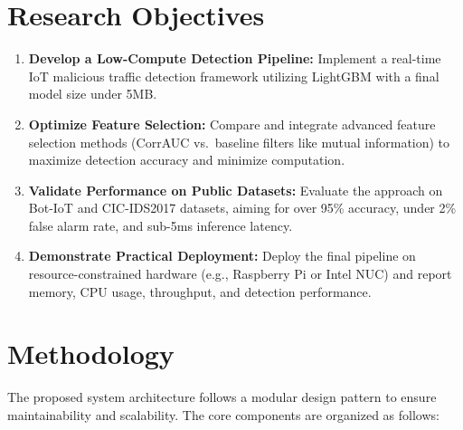\documentclass[12pt]{article}
\begin{document}

\section{Research Objectives}

\begin{enumerate}[(1)]
    \item \textbf{Develop a Low-Compute Detection Pipeline:} 
    Implement a real-time IoT malicious traffic detection framework utilizing LightGBM with a final model size under 5MB.
    
    \item \textbf{Optimize Feature Selection:} 
    Compare and integrate advanced feature selection methods (CorrAUC vs.\ baseline filters like mutual information) to maximize detection accuracy and minimize computation.
    
    \item \textbf{Validate Performance on Public Datasets:}
    Evaluate the approach on Bot-IoT and CIC-IDS2017 datasets, aiming for over 95\% accuracy, under 2\% false alarm rate, and sub-5ms inference latency.
    
    \item \textbf{Demonstrate Practical Deployment:}
    Deploy the final pipeline on resource-constrained hardware (e.g., Raspberry Pi or Intel NUC) and report memory, CPU usage, throughput, and detection performance.
\end{enumerate}


\section{Methodology}

The proposed system architecture follows a modular design pattern to ensure maintainability and scalability. The core components are organized as follows:
\end{document}
